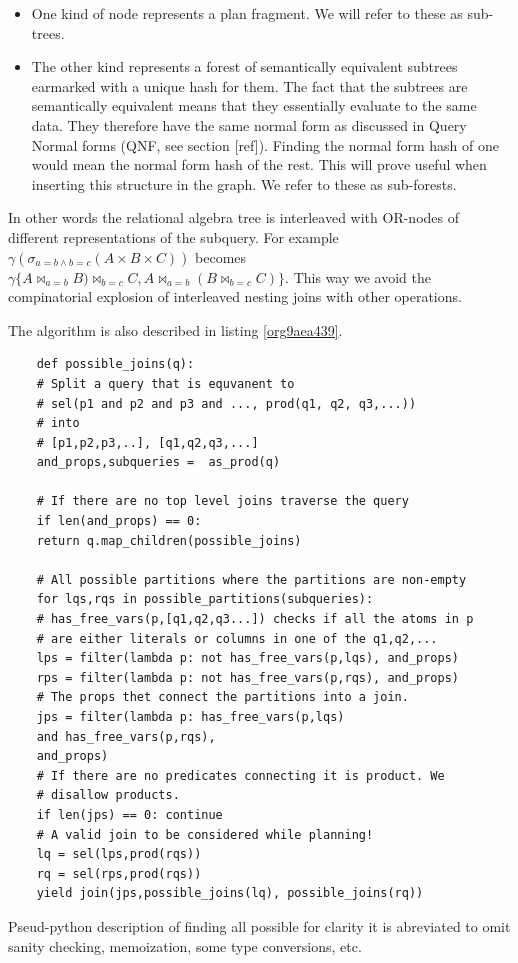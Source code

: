 \begin{itemize}
\item One kind of node represents a plan fragment. We will refer to
  these as sub-trees.
\item The other kind represents a forest of semantically equivalent
  subtrees earmarked with a unique hash for them. The fact that the
  subtrees are semantically equivalent means that they essentially
  evaluate to the same data. They therefore have the same normal form
  as discussed in Query Normal forms (QNF, see section [ref]). Finding
  the normal form hash of one would mean the normal form hash of the
  rest. This will prove useful when inserting this structure in the
  graph. We refer to these as sub-forests.
\end{itemize}

In other words the relational algebra tree is interleaved with
OR-nodes of different representations of the subquery. For example
\(\gamma(\sigma_{a=b \land b=c}(A \times B \times C))\) becomes
\(\gamma\{A \Join_{a=b} B) \Join_{b=c} C, A \Join_{a=b} (B \Join_{b=c}
C)\}\). This way we avoid the compinatorial explosion of interleaved
nesting joins with other operations.

The algorithm is also described in listing \ref{org9aea439}.

\begin{listing}[p]
  \begin{verbatim}
    def possible_joins(q):
    # Split a query that is equvanent to
    # sel(p1 and p2 and p3 and ..., prod(q1, q2, q3,...))
    # into
    # [p1,p2,p3,..], [q1,q2,q3,...]
    and_props,subqueries =  as_prod(q)

    # If there are no top level joins traverse the query
    if len(and_props) == 0:
    return q.map_children(possible_joins)

    # All possible partitions where the partitions are non-empty
    for lqs,rqs in possible_partitions(subqueries):
    # has_free_vars(p,[q1,q2,q3...]) checks if all the atoms in p
    # are either literals or columns in one of the q1,q2,...
    lps = filter(lambda p: not has_free_vars(p,lqs), and_props)
    rps = filter(lambda p: not has_free_vars(p,rqs), and_props)
    # The props thet connect the partitions into a join.
    jps = filter(lambda p: has_free_vars(p,lqs)
    and has_free_vars(p,rqs),
    and_props)
    # If there are no predicates connecting it is product. We
    # disallow products.
    if len(jps) == 0: continue
    # A valid join to be considered while planning!
    lq = sel(lps,prod(rqs))
    rq = sel(rps,prod(rqs))
    yield join(jps,possible_joins(lq), possible_joins(rq))
  \end{verbatim}
  \caption{\label{org9aea439}Pseud-python description of finding all possible for clarity it is abreviated to omit sanity checking, memoization, some type conversions, etc.}
\end{listing}

